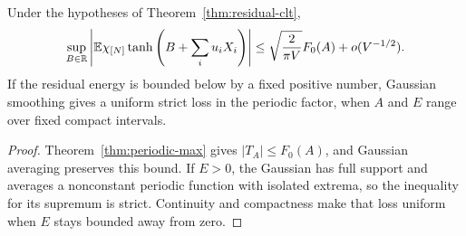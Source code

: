 \begin{corollary}
\label{cor:bulk-uniform-phase}
Under the hypotheses of Theorem~\ref{thm:residual-clt},
\[
 \sup_{B\in\mathbb R}\left|
 \mathbb E\chi_{[N]}\tanh\left(B+\sum_i u_iX_i\right)\right|
 \le\sqrt{\frac2{\pi V}}F_0(A)+o(V^{-1/2}).
\]
If the residual energy is bounded below by a fixed positive number,
Gaussian smoothing gives a uniform strict loss in the periodic factor,
when $A$ and $E$ range over fixed compact intervals.
\end{corollary}
\begin{proof}
Theorem~\ref{thm:periodic-max} gives $|T_A|\le F_0(A)$, and Gaussian
averaging preserves this bound. If $E>0$, the Gaussian has full support
and averages a nonconstant periodic function with isolated extrema, so
the inequality for its supremum is strict. Continuity and compactness
make that loss uniform when $E$ stays bounded away from zero.
\end{proof}

